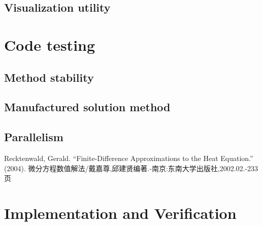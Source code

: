 \documentclass[3p]{elsarticle}
\numberwithin{equation}{section}
\begin{document}
	\subsection{Visualization utility}
	
	\section{Code testing}
	
	\subsection{Method stability}
	
	\subsection{Manufactured solution method}
	
	\subsection{Parallelism}
		
	\begin{thebibliography}{99}  
		Recktenwald, Gerald. “Finite-Difference Approximations to the Heat Equation.” (2004).  
		微分方程数值解法/戴嘉尊,邱建贤编著.-南京:东南大学出版社,2002.02.-233页
	\end{thebibliography}

	\section{Implementation and Verification}
\end{document}
